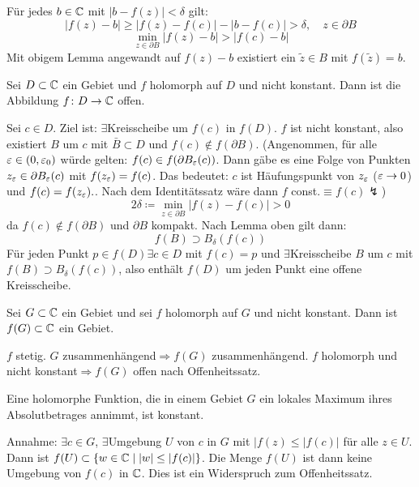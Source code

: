\begin{beweis}
	F\"ur jedes $ b\in\mathbb{C} $ mit $ |b-f(z)|<\delta $ gilt:
	\[ |f(z)-b|\geq |f(z)-f(c)|-|b-f(c)|>\delta,\quad z\in\partial B \]
    \[ \min_{z\in\partial B}|f(z)-b|>|f(c)-b| \]
    Mit obigem Lemma angewandt auf $ f(z)-b $ existiert ein $ \tilde z\in B $ mit $ f(\tilde z)=b $.
\end{beweis}
\begin{satz}[Offenheitssatz]
	Sei $ D\subset\mathbb{C} $ ein Gebiet und $ f $ holomorph auf $ D $ und nicht konstant. Dann ist die Abbildung $ f\colon D\rightarrow\mathbb{C} $ offen.
\end{satz}
\begin{beweis}
	Sei $ c\in D $. Ziel ist: $ \exists $Kreisscheibe um $ f(c) $ in $ f(D) $. $ f $ ist nicht konstant, also existiert $ B $ um $ c $ mit $ \bar B\subset D $ und $ f(c)\notin f(\partial B) $. (Angenommen, f\"ur alle $ \varepsilon\in(0,\varepsilon_0) $ w\"urde gelten: $ f(c)\in f(\partial B_\varepsilon(c)) $. Dann g\"abe es eine Folge von Punkten $ z_\varepsilon\in\partial B_\varepsilon(c) $ mit $ f(z_\varepsilon)=f(c) $. Das bedeutet: $ c $ ist H\"aufungspunkt von $ z_\varepsilon $ ($ \varepsilon\to 0 $) und $ f(c)=f(z_\varepsilon). $. Nach dem Identit\"atssatz w\"are dann $ f $ const.$ \equiv f(c)\lightning $)
	\[ 2\delta\coloneqq\min_{z\in\partial B}|f(z)-f(c)|>0 \]
	da $ f(c)\notin f(\partial B) $ und $ \partial B $ kompakt. Nach Lemma oben gilt dann:
	\[ f(B)\supset B_\delta(f(c)) \]
	F\"ur jeden Punkt $ p\in f(D)\exists c\in D $ mit $ f(c)=p $ und $ \exists $Kreisscheibe $ B $ um $ c $ mit $ f(B)\supset B_\delta(f(c)) $, also enth\"alt $ f(D) $ um jeden Punkt eine offene Kreisscheibe. 
\end{beweis}
\begin{satz}
	Sei $ G\subset\mathbb{C} $ ein Gebiet und sei $ f $ holomorph auf $ G $ und nicht konstant. Dann ist $ f(G)\subset\mathbb{C} $ ein Gebiet.
\end{satz}
\begin{beweis}
	$ f $ stetig. $ G $ zusammenh\"angend$ \Rightarrow f(G) $ zusammenh\"angend. $ f $ holomorph und nicht konstant$ \Rightarrow f(G) $ offen nach Offenheitssatz.
\end{beweis}
\begin{satz}[Maximumprinzip]
	Eine holomorphe Funktion, die in einem Gebiet $ G $ ein lokales Maximum ihres Absolutbetrages annimmt, ist konstant.
\end{satz}
\begin{beweis}
	Annahme: $ \exists c\in G $, $ \exists $Umgebung $ U $ von $ c $ in $ G $ mit $ |f(z)\leq|f(c)| $ f\"ur alle $ z\in U $. Dann ist $ f(U)\subset\lbrace w\in\mathbb{C}\mid |w|\leq |f(c)|\rbrace $. Die Menge $ f(U) $ ist dann keine Umgebung von $ f(c) $ in $ \mathbb{C} $. Dies ist ein Widerspruch zum Offenheitssatz.
\end{beweis}
